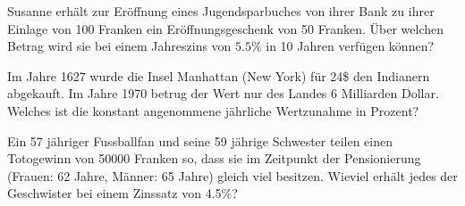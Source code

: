 \documentclass[%
11pt,%
twoside,%
titlepage,%
german,%
headsepline%
]{scrartcl}
\begin{document}
\begin{ueb}[Susanna]
Susanne erhält zur Eröffnung eines Jugendsparbuches von ihrer Bank zu ihrer Einlage von 100 Franken ein Eröffnungsgeschenk von 50 Franken. Über welchen Betrag wird sie bei einem Jahreszins von $5.5\%$ in 10 Jahren verfügen können?
\end{ueb}

\begin{ueb}[Manhatten]
Im Jahre 1627 wurde die Insel Manhattan (New York) für 24\$ den Indianern abgekauft. Im Jahre 1970 betrug der Wert nur des Landes 6 Milliarden Dollar. Welches ist die konstant angenommene jährliche Wertzunahme in Prozent?
\end{ueb}

\begin{ueb}[Toto]
Ein 57 jähriger Fussballfan und seine 59 jährige Schwester teilen einen Totogewinn von 50000 Franken so, dass sie im Zeitpunkt der Pensionierung (Frauen: 62 Jahre, Männer: 65 Jahre) gleich viel besitzen. Wieviel erhält jedes der Geschwister bei einem Zinssatz von 4.5\%?
\end{ueb}
\end{document}
